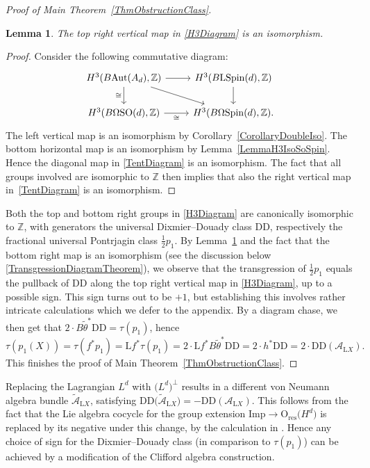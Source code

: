 \documentclass[11pt]{article}
\numberwithin{equation}{section}
\numberwithin{equation}{section}
\newtheorem{Lemma}[Theorem]{Lemma}
\newcommand{\Z}{\mathbb{Z}}
\newcommand{\A}{\mathcal{A}}
\newcommand{\SO}{\mathrm{SO}}
\newcommand{\res}{\mathrm{res}}
\newcommand{\Aut}{\mathrm{Aut}}
\newcommand{\Spin}{\mathrm{Spin}}
\newcommand{\Imp}{\mathrm{Imp}}
\renewcommand{\O}{\mathrm{O}}
\renewcommand{\L}{\mathrm{L}}
\newcommand{\DD}{\mathrm{DD}}
\begin{document}
\begin{proof}[Proof of Main Theorem~\ref{ThmObstructionClass}]
\begin{Lemma} \label{LemmaIsomorphismTopRightH3}
The top right vertical map in \eqref{H3Diagram} is an isomorphism.
\end{Lemma}

\begin{proof}
Consider the following commutative diagram:
\begin{equation} \label{TentDiagram}
\begin{tikzcd}
H^3(B \Aut(A_d), \Z) \ar[d, "\cong"'] \ar[r] \ar[dr]
&
H^3(B\L\Spin(d), \Z)
\ar[d]
 \\
H^3(B\Omega\SO(d), \Z) \ar[r, "\cong"'] & H^3(B\Omega\Spin(d), \Z).
\end{tikzcd}
\end{equation}
The left vertical map is an isomorphism by Corollary~\ref{CorollaryDoubleIso}.
The bottom horizontal map is an isomorphism by Lemma~\ref{LemmaH3IsoSoSpin}.
Hence the diagonal map in \eqref{TentDiagram} is an isomorphism.
The fact that all groups involved are isomorphic to $\Z$ then implies that also the right vertical map in~\eqref{TentDiagram} is an isomorphism.
\end{proof}

Both the top and bottom right groups in \eqref{H3Diagram} are canonically isomorphic to $\Z$, with generators the universal Dixmier--Douady class $\DD$, respectively the fractional universal Pontrjagin class $\frac{1}{2}p_1$.
By Lemma~\ref{LemmaIsomorphismTopRightH3} and the fact that the bottom right map is an isomorphism (see the discussion below \eqref{TransgressionDiagramTheorem}), we observe that the transgression of $\frac{1}{2}p_1$ equals the pullback of $\DD$ along the top right vertical map in \eqref{H3Diagram}, up to a possible sign.
This sign turns out to be $+1$, but establishing this involves rather intricate calculations which we defer to the appendix.
By a diagram chase, we then get that $2\cdot B\tilde{\theta}^* \DD = \tau(p_1)$, hence
\begin{equation*}
 \tau(p_1(X)) = \tau(f^* p_1) = \L f^* \tau(p_1) = 2\cdot \L f^* B\tilde{\theta}^* \DD = 2 \cdot h^* \DD = 2\cdot\DD(\A_{\L X}).
\end{equation*}
This finishes the proof of Main Theorem~\ref{ThmObstructionClass}.
\end{proof}

\begin{Remark} \label{RemarkSign}
Replacing the Lagrangian $L^d$ with $\big(L^d\big)^\perp$ results in a different von Neumann algebra bundle $\tilde{\mathcal{A}}_{\L X}$, satisfying $\DD\big(\tilde{\mathcal{A}}_{\L X}\big) = -\DD(\mathcal{A}_{\L X})$.
This follows from the fact that the Lie algebra cocycle for the group extension $\Imp \to \O_{\res}\big(H^d\big)$ is replaced by its negative under this change, by the calculation in \cite[Theorem~6.10]{Araki1}.
Hence any choice of sign for the Dixmier--Douady class (in comparison to $\tau(p_1)$) can be achieved by a modification of the Clifford algebra construction.
\end{Remark}
\end{document}
